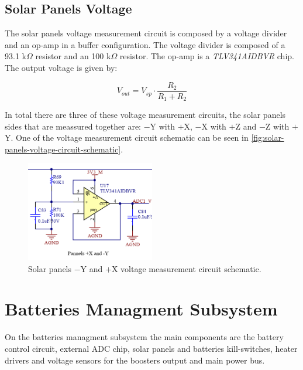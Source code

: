 \subsection{Solar Panels Voltage}

The solar panels voltage measurement circuit is composed by a voltage divider and an op-amp in a buffer configuration. The voltage divider is composed of a 93.1 k$\Omega$ resistor and an 100 k$\Omega$ resistor. The op-amp is a \textit{TLV341AIDBVR} chip. The output voltage is given by:

\begin{equation}
V_{out} = V_{sp} \cdot \frac{R_{2}}{R_{1} + R_{2}}
\end{equation}

In total there are three of these voltage measurement circuits, the solar panels sides that are meassured together are: $-$Y with $+$X, $-$X with $+$Z and $-$Z with $+$Y.
One of the voltage measurement circuit schematic can be seen in \autoref{fig:solar-panels-voltage-circuit-schematic}.

\begin{figure}[!ht]
    \begin{center}
        \includegraphics[width=0.5\textwidth]{figures/solar-panels-voltage-circuit-schematic}
        \caption{Solar panels $-$Y and $+$X voltage measurement circuit schematic.}
        \label{fig:solar-panels-voltage-circuit-schematic}
    \end{center}
\end{figure}

\section{Batteries Managment Subsystem}

On the batteries managment subsystem the main components are the battery control circuit, external ADC chip, solar panels and batteries kill-switches, heater drivers and voltage sensors for the boosters output and main power bus. 

